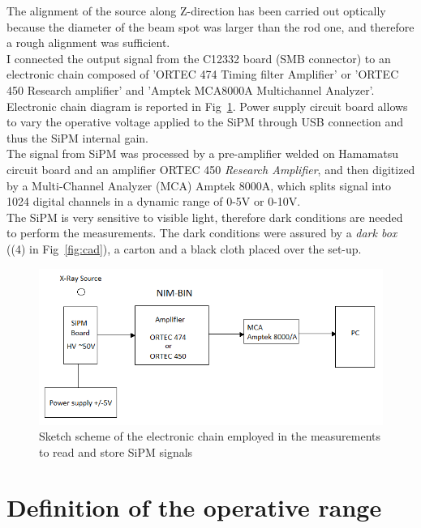 \documentclass[10pt,a4paper, openany]{book}
\begin{document}
The alignment of the source along Z-direction has been carried out optically because the diameter of the beam spot was larger than the rod one, and therefore a rough alignment was sufficient.\\
I connected the output signal from the C12332 board (SMB connector) to an electronic chain composed of 'ORTEC 474 Timing filter Amplifier' or 'ORTEC 450 Research amplifier' and 'Amptek MCA8000A Multichannel Analyzer'. Electronic chain diagram is reported in Fig~\ref{fig:el_scheme}. Power supply circuit board allows to vary the operative voltage applied to the SiPM through USB connection and thus the SiPM internal gain.\\
The signal from SiPM was processed by a pre-amplifier welded on Hamamatsu circuit board and an amplifier ORTEC 450 \emph{Research Amplifier}, and then digitized by a Multi-Channel Analyzer (MCA) Amptek 8000A, which splits signal into 1024 digital channels in a dynamic range of 0-5V or 0-10V.\\
The SiPM is very sensitive to visible light, therefore dark conditions are needed to perform the measurements. The dark conditions were assured by a \emph{dark box} ((4) in Fig~\ref{fig:cad}), a carton and a black cloth placed over the set-up.

\begin{figure}[!h]
\begin{center}
\includegraphics[scale=0.51]{imm/chain.png}
\end{center}
\caption{Sketch scheme of the electronic chain employed in the measurements to read and store SiPM signals}
\label{fig:el_scheme}
\end{figure}
\newpage
\section{Definition of the operative range}
\end{document}
